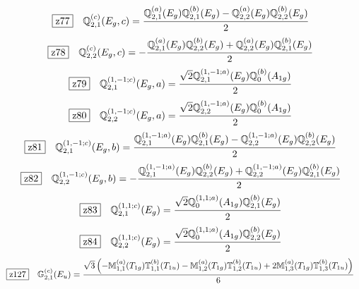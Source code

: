 \documentclass[fleqn,10pt,landscape]{jsarticle}
\begin{document}
\begin{dmath*}
\hspace*{3mm}\fbox{z77}\quad \mathbb{Q}_{2,1}^{(c)}(E_{g},c)=\frac{\mathbb{Q}_{2,1}^{(a)}(E_{g}) \mathbb{Q}_{2,1}^{(b)}(E_{g}) - \mathbb{Q}_{2,2}^{(a)}(E_{g}) \mathbb{Q}_{2,2}^{(b)}(E_{g})}{2}
\end{dmath*}
\begin{dmath*}
\hspace*{3mm}\fbox{z78}\quad \mathbb{Q}_{2,2}^{(c)}(E_{g},c)=- \frac{\mathbb{Q}_{2,1}^{(a)}(E_{g}) \mathbb{Q}_{2,2}^{(b)}(E_{g}) + \mathbb{Q}_{2,2}^{(a)}(E_{g}) \mathbb{Q}_{2,1}^{(b)}(E_{g})}{2}
\end{dmath*}
\begin{dmath*}
\hspace*{3mm}\fbox{z79}\quad \mathbb{Q}_{2,1}^{(1,-1;c)}(E_{g},a)=\frac{\sqrt{2} \mathbb{Q}_{2,1}^{(1,-1;a)}(E_{g}) \mathbb{Q}_{0}^{(b)}(A_{1g})}{2}
\end{dmath*}
\begin{dmath*}
\hspace*{3mm}\fbox{z80}\quad \mathbb{Q}_{2,2}^{(1,-1;c)}(E_{g},a)=\frac{\sqrt{2} \mathbb{Q}_{2,2}^{(1,-1;a)}(E_{g}) \mathbb{Q}_{0}^{(b)}(A_{1g})}{2}
\end{dmath*}
\begin{dmath*}
\hspace*{3mm}\fbox{z81}\quad \mathbb{Q}_{2,1}^{(1,-1;c)}(E_{g},b)=\frac{\mathbb{Q}_{2,1}^{(1,-1;a)}(E_{g}) \mathbb{Q}_{2,1}^{(b)}(E_{g}) - \mathbb{Q}_{2,2}^{(1,-1;a)}(E_{g}) \mathbb{Q}_{2,2}^{(b)}(E_{g})}{2}
\end{dmath*}
\begin{dmath*}
\hspace*{3mm}\fbox{z82}\quad \mathbb{Q}_{2,2}^{(1,-1;c)}(E_{g},b)=- \frac{\mathbb{Q}_{2,1}^{(1,-1;a)}(E_{g}) \mathbb{Q}_{2,2}^{(b)}(E_{g}) + \mathbb{Q}_{2,2}^{(1,-1;a)}(E_{g}) \mathbb{Q}_{2,1}^{(b)}(E_{g})}{2}
\end{dmath*}
\begin{dmath*}
\hspace*{3mm}\fbox{z83}\quad \mathbb{Q}_{2,1}^{(1,1;c)}(E_{g})=\frac{\sqrt{2} \mathbb{Q}_{0}^{(1,1;a)}(A_{1g}) \mathbb{Q}_{2,1}^{(b)}(E_{g})}{2}
\end{dmath*}
\begin{dmath*}
\hspace*{3mm}\fbox{z84}\quad \mathbb{Q}_{2,2}^{(1,1;c)}(E_{g})=\frac{\sqrt{2} \mathbb{Q}_{0}^{(1,1;a)}(A_{1g}) \mathbb{Q}_{2,2}^{(b)}(E_{g})}{2}
\end{dmath*}
\begin{dmath*}
\hspace*{3mm}\fbox{z127}\quad \mathbb{G}_{2,1}^{(c)}(E_{u})=\frac{\sqrt{3} \left(- \mathbb{M}_{1,1}^{(a)}(T_{1g}) \mathbb{T}_{1,1}^{(b)}(T_{1u}) - \mathbb{M}_{1,2}^{(a)}(T_{1g}) \mathbb{T}_{1,2}^{(b)}(T_{1u}) + 2 \mathbb{M}_{1,3}^{(a)}(T_{1g}) \mathbb{T}_{1,3}^{(b)}(T_{1u})\right)}{6}
\end{dmath*}
\end{document}
